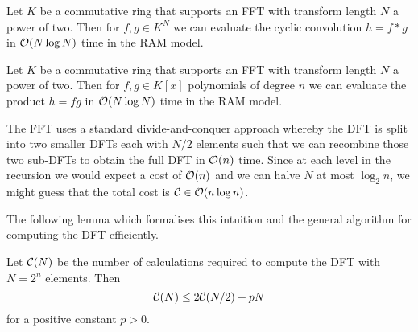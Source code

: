 \begin{corollary}
    Let $K$ be a commutative ring that supports an FFT with transform length $N$ a power of two. Then for $f, g \in K^N$ we can evaluate the cyclic convolution $h = f \ast g$ in $\mathcal O(N\log N)$ time in the RAM model. 
\end{corollary}

\begin{corollary}
    Let $K$ be a commutative ring that supports an FFT with transform length $N$ a power of two. Then for $f, g \in K[x]$ polynomials of degree $n$ we can evaluate the product $h = fg$ in $\mathcal O(N\log N)$ time in the RAM model. 
\end{corollary}

The FFT uses a standard divide-and-conquer approach whereby the DFT is split into two smaller DFTs each with $N/2$ elements such that we can recombine those two sub-DFTs to obtain the full DFT in $\mathcal O(n)$ time. Since at each level in the recursion we would expect a cost of $\mathcal O(n)$ and we can halve $N$ at most $\log_2 n$, we might guess that the total cost is $\mathcal C \in \mathcal O(n \log n)$.

The following lemma which formalises this intuition and the general algorithm for computing the DFT efficiently. 

\begin{lemma}\label{lem:fft-recursion}
    Let $\mathcal C(N)$ be the number of calculations required to compute the DFT with $N = 2^n$ elements. Then
    \begin{equation}
        \mathcal C(N) \le 2 \mathcal C(N/2) + pN \label{eq:fftlem}
    \end{equation}
    for a positive constant $p > 0$.
\end{lemma}

